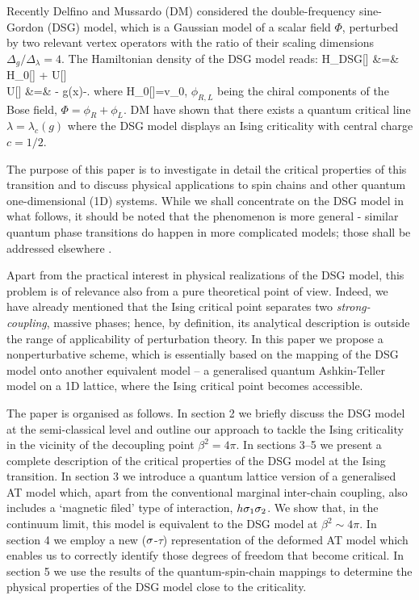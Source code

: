 Recently Delfino and Mussardo (DM)\cite{DM} considered
the double-frequency sine-Gordon (DSG) model, which is a 
Gaussian model of a scalar field $\Phi$, 
perturbed by two relevant vertex operators with
the ratio of their scaling dimensions $\Delta_g/\Delta_{\lambda}=4$.
The Hamiltonian density of the DSG model reads:
\bea
{\cal H}_{DSG}[\Phi] &=& {\cal H}_0[\Phi] + {\cal U}[\Phi]\nonumber\\
 {\cal U}[\Phi] &=&
- g\cos\beta\Phi(x)-\lambda{}.
\label{HDSG}
\eea
where 
\be
{\cal H}_0[\Phi]=v_0,
\label{HPhifree}
\ee
$\phi_{R,L}$ being the chiral components of the Bose field,
$\Phi=\phi_R+\phi_L$.
DM have shown that there exists a quantum critical 
line $\lambda=\lambda_c(g)$ where the DSG model displays
an Ising criticality with central charge $c=1/2$.


The purpose of this paper is to investigate in detail 
the critical properties of this 
transition and to discuss physical applications
to spin chains and other quantum one-dimensional (1D)
systems. While we shall concentrate on the DSG model in what follows,
it should be noted that the phenomenon is more general - similar quantum
phase transitions do happen in more complicated models;
those shall be addressed elsewhere \cite{else}. 



Apart from the practical interest in physical realizations of the DSG model,
this problem is of relevance also from a pure 
theoretical point of view. Indeed, 
we have already mentioned that the Ising critical point separates 
two {\sl strong-coupling}, massive phases; hence, by definition,
its analytical description is outside the range of applicability 
of perturbation theory. In this paper we propose a nonperturbative 
scheme, which is essentially based on the mapping of the DSG model onto 
another equivalent model -- a generalised quantum Ashkin-Teller model
on a 1D lattice, where the Ising critical point becomes accessible.

The paper is organised as follows. In section 2 we briefly discuss 
the DSG model at the semi-classical level and outline our approach
to tackle the Ising criticality in the vicinity of the decoupling
point $\beta^2 = 4\pi$. 
In sections 3--5 we present 
a complete description of the critical properties of the DSG model
at the Ising transition.
In section 3 we introduce a quantum lattice
version of a generalised AT model which, apart from
the conventional marginal inter-chain coupling, also includes a
`magnetic filed' type of interaction, $h \sigma_1 \sigma_2$. We show that,
in the continuum limit, this model is equivalent to the DSG model
at $\beta^2 \sim 4\pi$. In section 4 we employ a new 
($\sigma$-$\tau$) representation of the deformed AT model 
which enables us
to correctly identify those degrees of freedom that become critical.
 In section 5
we use the results of the quantum-spin-chain mappings to determine
the physical properties of the DSG model close to the criticality.  


